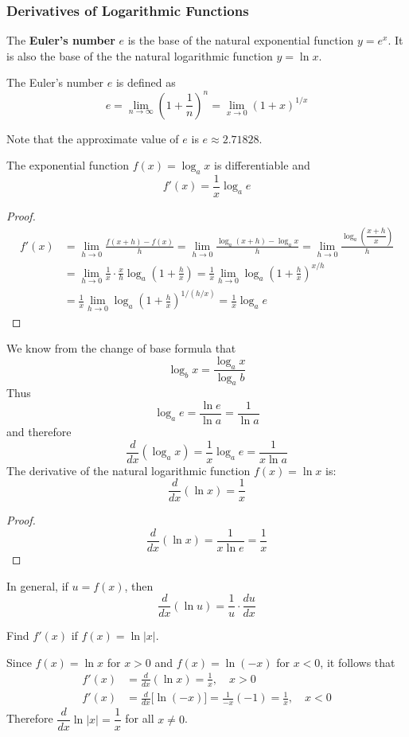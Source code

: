 \subsubsection*{Derivatives of Logarithmic Functions}
The \textbf{Euler's number} \(e\) is the base of the natural exponential
function \(y=e^x\).
It is also the base of the the natural logarithmic function \(y=\ln x\).
\begin{definition}
    The Euler's number \(e\) is defined as
    \[e=\lim_{n\to\infty}\left(1+\frac{1}{n}\right)^n
    =\lim_{x\to 0}(1+x)^{1/x}\]
\end{definition}
Note that the approximate value of \(e\) is \(e\approx2.71828\).
\begin{theorem}
    The exponential function \(f(x)=\log_a x\) is differentiable and
    \[f'(x)=\frac{1}{x}\log_a e\]
\end{theorem}
\begin{proof}
    \begin{align*}
        f'(x) &= \lim_{h\to 0}\frac{f(x+h)-f(x)}{h}
        = \lim_{h\to 0}\frac{\log_a(x+h)-\log_a x}{h}
        =\lim_{h\to 0}\frac{\log_a\left(\dfrac{x+h}{x}\right)}{h} \\
        &= \lim_{h\to 0}\frac{1}{x}\cdot\frac{x}{h}
        \log_a\left(1+\frac{h}{x}\right)
        = \frac{1}{x}
            \lim_{h\to 0}\log_a\left(1+\frac{h}{x}\right)^{x/h} \\
        &=\frac{1}{x}
            \lim_{h\to 0}\log_a\left(1+\frac{h}{x}\right)^{1/(h/x)}
        =\frac{1}{x}\log_a e
    \end{align*}
\end{proof}
We know from the change of base formula that
\[\log_b x=\frac{\log_a x}{\log_a b}\]
Thus
\[\log_a e=\frac{\ln e}{\ln a}=\frac{1}{\ln a}\]
and therefore
\[\frac{d}{dx}(\log_a x)=\frac{1}{x}\log_a e=\frac{1}{x\ln a}\]
The derivative of the natural logarithmic function \(f(x)=\ln x\) is:
\[\frac{d}{dx}(\ln x)=\frac{1}{x}\]
\begin{proof}
    \[\frac{d}{dx}(\ln x)=\frac{1}{x\ln e}=\frac{1}{x}\]
\end{proof}
In general, if \(u=f(x)\), then
\[\frac{d}{dx}(\ln u)=\frac{1}{u}\cdot\frac{du}{dx}\]
\begin{problem}
    Find \(f'(x)\) if \(f(x)=\ln|x|\).
\end{problem}
\begin{solution}
    Since \(f(x)=\ln x\) for \(x>0\) and \(f(x)=\ln(-x)\) for \(x<0\),
    it follows that
    \begin{align*}
        f'(x) &= \frac{d}{dx}(\ln x)=\frac{1}{x},\quad x>0 \\
        f'(x) &= \frac{d}{dx}\big[\ln(-x)\big]=\frac{1}{-x}(-1)
        =\frac{1}{x},\quad x<0
    \end{align*}
    Therefore \(\dfrac{d}{dx}\ln|x|=\dfrac{1}{x}\) for all \(x\neq 0\).
\end{solution}

